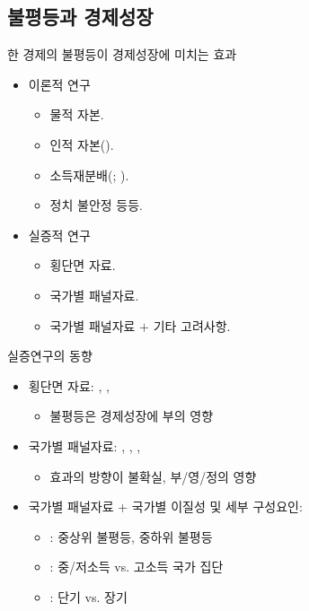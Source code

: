 \documentclass[handout, 10pt]{beamer}
\begin{document}
\subsection{불평등과 경제성장}
\begin{frame}{한 경제의 불평등이 경제성장에 미치는 효과}
    \begin{itemize}
        \item 이론적 연구
        \begin{itemize}
            \item 물적 자본.
            \item 인적 자본(\cite{gnz93}).
            \item 소득재분배(\cite{anr94}; \cite{pnt94}).
            \item 정치 불안정 등등.
        \end{itemize}
        \item 실증적 연구
        \begin{itemize}
            \item 횡단면 자료.
            \item 국가별 패널자료.
            \item 국가별 패널자료 $+$ 기타 고려사항.
        \end{itemize}
    \end{itemize}
\end{frame}

\begin{frame}{실증연구의 동향}
    \begin{itemize}
        \item 횡단면 자료: \cite{barro91}, \cite{anr94}, \cite{pnt94}
        \begin{itemize}
            \item 불평등은 경제성장에 부의 영향
        \end{itemize}
        \item 국가별 패널자료: \cite{lnz98}, \cite{barro20}, \cite{forbes00}, \cite{bnd03}
        \begin{itemize}
            \item 효과의 방향이 불확실, 부/영/정의 영향
        \end{itemize}
        \item 국가별 패널자료 + 국가별 이질성 및 세부 구성요인:
        \begin{itemize}
            \item \cite{voit05, voit11}: 중상위 불평등, 중하위 불평등
            \item \cite{cc10}: 중/저소득 vs. 고소득 국가 집단
            \item \cite{hetl14}: 단기 vs. 장기
        \end{itemize}
    \end{itemize}
\end{frame}
\end{document}
